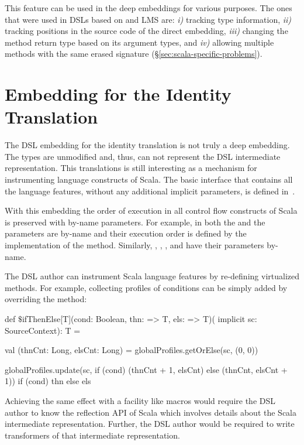 This feature can be used in the deep embeddings for various purposes. The ones that
were used in DSLs based on \yy and LMS are: \emph{i)} tracking type information, \emph{ii)} tracking
positions in the source code of the direct embedding, \emph{iii)} changing the method return type
based on its argument types, and \emph{iv)} allowing multiple methods with the
same erased signature (\S \ref{sec:scala-specific-problems}).


\section{Embedding for the Identity Translation}
\label{sec:identity-embedding}

The DSL embedding for the identity translation is not truly a deep embedding. The
types are unmodified and, thus, can not represent the DSL intermediate representation.
This translations is still interesting as a mechanism for instrumenting language
constructs of Scala. The basic interface that contains all the language features,
 without any additional implicit parameters, is defined in~.

With this embedding the order of execution in all control flow constructs of Scala is preserved with
 by-name parameters. For example, in  both the  and the  parameters
are by-name and their execution order is defined by the implementation of the method. Similarly,
, , , and  have their
 parameters by-name.

The DSL author can instrument Scala language features by re-defining virtualized methods. For example,
 collecting profiles of  conditions can be simply added by overriding the
 method:\begin{lstparagraph}
def $\$$ifThenElse[T](cond: Boolean, thn: => T, els: => T)(
  implicit sc: SourceContext): T = {
  val (thnCnt: Long, elsCnt: Long) =
    globalProfiles.getOrElse(sc, (0, 0))

  globalProfiles.update(sc,
    if (cond) (thnCnt + 1, elsCnt)
    else (thnCnt, elsCnt + 1))
  if (cond) thn else els
}
\end{lstparagraph}

Achieving the same effect with a facility like macros would require the DSL author to know the
reflection API of Scala which involves details about the Scala intermediate representation.
Further, the DSL author would be required to write transformers of that intermediate representation.

